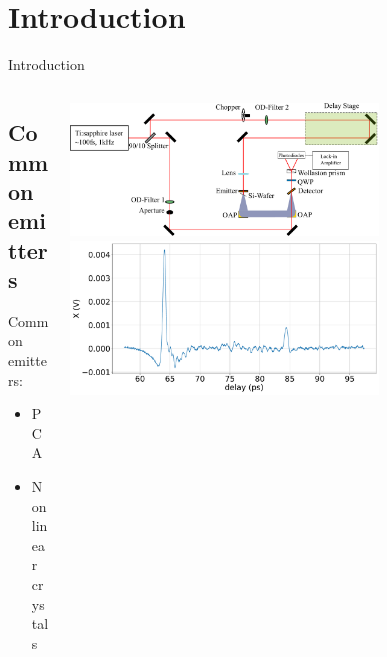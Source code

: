\documentclass[aspectratio=1610, 9pt]{beamer}
\begin{document}
\section{Introduction}
\begin{frame}{Introduction}
\begin{columns}
  \begin{column}{.3\textwidth}
    \subsection{Common emitters}
    {\Large Common emitters:}
    \normalsize
    \vspace{0.3in}
    \begin{itemize}
      \item PCA 
      \vspace{0.3in}
      \item{Non linear crystals}
    \end{itemize}
  \end{column}
  \begin{column}{.7\textwidth}
    \includegraphics[width=0.7\textwidth]{images/Aufbau.pdf}
  \vspace{0.3in}
    \includegraphics[width=0.7\textwidth]{images/2_11_30_20normalX.pdf}
  \end{column}
\end{columns}
\end{frame}
\end{document}
